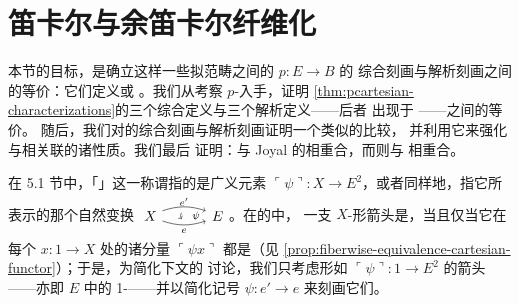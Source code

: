 
\providecommand{\sSet}{s\mathcal{S}et}%
\providecommand{\qcThree}{\mathbf{3}} %
\providecommand{\rvTranspose}[1]{\ulcorner #1\urcorner}%
\providecommand{\QCat}{\mathcal{Q}\mathit{Cat}}%
\providecommand{\cellpair}[5]{$\vcenter{\hbox{\begin{tikzpicture}[x=1.15em,y=1.15em]%
\node (s) at (0,0) {$#1$};%
\node (t) at (4.2,0) {$#2$};%
\draw[->] (0.75,0.32) to[bend left=18] (3.45,0.32);%
\node at (2.1,0.88) {$\scriptstyle#3$};%
\draw[->] (0.75,-0.32) to[bend right=18] (3.45,-0.32);%
\node at (2.1,-0.93) {$\scriptstyle#4$};%
\draw[->] (1.95,0.2) to[bend right=32] (1.95,-0.2);%
\node at (2.85,0) {$\scriptstyle#5$};%
\end{tikzpicture}}}$\ignorespaces}

\section{笛卡尔与余笛卡尔纤维化}\label{sec:f-cartesian-cocartesian-fibrations}

本节的目标，是确立这样一些拟范畴之间的\trIsofibration{} $p\colon E\to B$ 的%
综合刻画与解析刻画之间的等价：它们定义\trCartesianFibration{}或%
\trCocartesianFibration。我们从考察 $p$-\trCartesianArrow{}入手，证明%
\cref{thm:pcartesian-characterizations}的三个综合定义与三个解析定义——后者
出现于 \cite[2.4.1.1, 2.4.1.4, 2.4.1.8]{bib78}——之间的等价。
随后，我们对\trCartesianFibration{}的综合刻画与解析刻画证明一个类似的比较，
并利用它来强化与\trCartesianFibration{}相关联的诸\trLifting{}性质。我们最后
证明：\trDiscreteCocartesianFibration{}与 Joyal 的\trLeftFibration{}相重合，而\trDiscreteCartesianFibration{}则与%
\trRightFibration{}相重合。

在 5.1 节中，「\trCartesianArrow」这一称谓指的是广义元素%
$\rvTranspose{\psi}\colon X\to E^{2}$，或者同样地，指它所表示的那个自然变换
\cellpair{X}{E}{e'}{e}{\psi}。在\trQuasiCategory{}的\trInfinityCosmos{}中，
一支 $X$-形箭头是\trCartesian，当且仅当它在每个\trElement{} $x\colon 1\to X$
处的诸分量 $\rvTranspose{\psi x}$ 都是\trCartesian{}（见%
\cref{prop:fiberwise-equivalence-cartesian-functor}）；于是，为简化下文的
讨论，我们只考虑形如 $\rvTranspose{\psi}\colon 1\to E^{2}$ 的箭头——亦即 $E$
中的 1-\trSimplex——并以简化记号 $\psi\colon e'\to e$ 来刻画它们。

